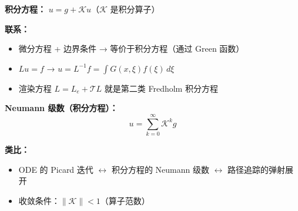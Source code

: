\textbf{积分方程：} $u = g + \mathcal{K}u$（$\mathcal{K}$ 是积分算子）

\textbf{联系：}
\begin{itemize}
  \item 微分方程 + 边界条件 → 等价于积分方程（通过 Green 函数）
  \item $Lu = f$ → $u = L^{-1}f = \int G(x,\xi)f(\xi)\,d\xi$
  \item 渲染方程 $L = L_e + \mathcal{T}L$ 就是第二类 Fredholm 积分方程
\end{itemize}

\textbf{Neumann 级数（积分方程）：}
\[
u = \sum_{k=0}^{\infty} \mathcal{K}^k g
\]

\textbf{类比：}
\begin{itemize}
  \item ODE 的 Picard 迭代 $\leftrightarrow$ 积分方程的 Neumann 级数 $\leftrightarrow$ 路径追踪的弹射展开
  \item 收敛条件：$\|\mathcal{K}\| < 1$（算子范数）
\end{itemize}